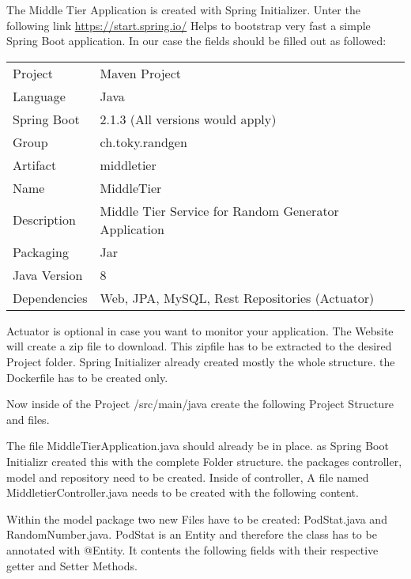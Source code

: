 The Middle Tier Application is created with Spring Initializer.
Unter the following link \url{https://start.spring.io/} Helps to bootstrap very fast a simple Spring Boot application.
In our case the fields should be filled out as followed:
\begin{tabbing}
\begin{tabular}{ll}
Project & Maven Project \\
Language & Java \\
Spring Boot & 2.1.3 (All versions would apply) \\
Group & ch.toky.randgen \\
Artifact & middletier \\
Name & MiddleTier \\
Description & Middle Tier Service for Random Generator Application \\
Packaging & Jar \\
Java Version & 8 \\
Dependencies & Web, JPA, MySQL, Rest Repositories (Actuator)
\end{tabular}
\end{tabbing}
Actuator is optional in case you want to monitor your application.
The Website will create a zip file to download. This zipfile has to be extracted to the desired Project folder.
Spring Initializer already created mostly the whole structure. the Dockerfile has to be created only.

Now inside of the Project /src/main/java create the following Project  Structure and files.

The file MiddleTierApplication.java should already be in place. as Spring Boot Initializr created this with the complete Folder structure. the packages controller, model and repository need to be created.
Inside of controller, A file named MiddletierController.java needs to be created with the following content.

Within the model package two new Files have to be created: PodStat.java and RandomNumber.java.
\newpage
PodStat is an Entity and therefore the class has to be annotated with @Entity.
It contents the following fields with their respective getter and Setter Methods.
 


